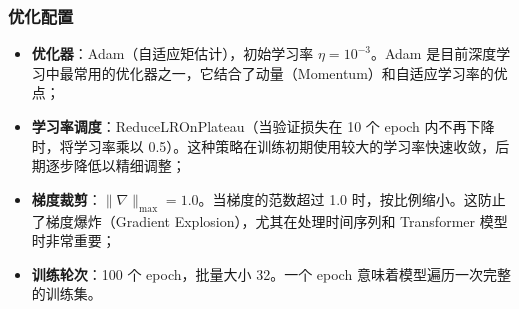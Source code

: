 \documentclass[UTF8]{ctexart}
\begin{document}
\subsubsection{优化配置}

\begin{itemize}
    \item \textbf{优化器}：Adam（自适应矩估计），初始学习率 $\eta = 10^{-3}$。Adam 是目前深度学习中最常用的优化器之一，它结合了动量（Momentum）和自适应学习率的优点；
    \item \textbf{学习率调度}：ReduceLROnPlateau（当验证损失在 10 个 epoch 内不再下降时，将学习率乘以 0.5）。这种策略在训练初期使用较大的学习率快速收敛，后期逐步降低以精细调整；
    \item \textbf{梯度裁剪}：$\|\nabla\|_{\max} = 1.0$。当梯度的范数超过 1.0 时，按比例缩小。这防止了梯度爆炸（Gradient Explosion），尤其在处理时间序列和 Transformer 模型时非常重要；
    \item \textbf{训练轮次}：100 个 epoch，批量大小 32。一个 epoch 意味着模型遍历一次完整的训练集。
\end{itemize}
\end{document}
